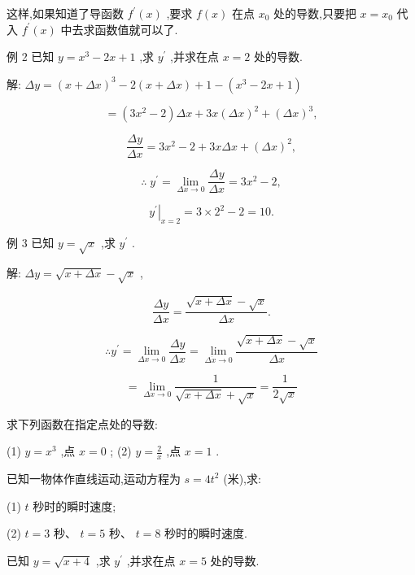 \documentclass[lang=cn,newtx,10pt,scheme=chinese]{elegantbook}
\begin{document}
这样,如果知道了导函数 \({f}^{\prime }\left( x\right)\) ,要求 \(f\left( x\right)\) 在点 \({x}_{0}\) 处的导数,只要把 \(x = {x}_{0}\) 代入 \({f}^{\prime }\left( x\right)\) 中去求函数值就可以了.

例 2 已知 \(y = {x}^{3} - {2x} + 1\) ,求 \({y}^{\prime }\) ,并求在点 \(x = 2\) 处的导数.

解: \({\Delta y} = {\left( x + \Delta x\right) }^{3} - 2\left( {x + {\Delta x}}\right) + 1 - \left( {{x}^{3} - {2x} + 1}\right)\)

\[
= \left( {3{x}^{2} - 2}\right) {\Delta x} + {3x}{\left( \Delta x\right) }^{2} + {\left( \Delta x\right) }^{3},
\]

\[
\frac{\Delta y}{\Delta x} = 3{x}^{2} - 2 + {3x\Delta x} + {\left( \Delta x\right) }^{2},
\]

\[
\therefore \;{y}^{\prime } = \mathop{\lim }\limits_{{{\Delta x} \rightarrow 0}}\frac{\Delta y}{\Delta x} = 3{x}^{2} - 2,
\]

\[
{\left. {y}^{\prime }\right| }_{x = 2} = 3 \times {2}^{2} - 2 = {10}.
\]

例 3 已知 \(y = \sqrt{x}\) ,求 \({y}^{\prime }\) .

解: \({\Delta y} = \sqrt{x + {\Delta x}} - \sqrt{x}\) ,

\[
\frac{\Delta y}{\Delta x} = \frac{\sqrt{x + {\Delta x}} - \sqrt{x}}{\Delta x}.
\]

\[
\therefore {y}^{\prime } = \mathop{\lim }\limits_{{{\Delta x} \rightarrow 0}}\frac{\Delta y}{\Delta x} = \mathop{\lim }\limits_{{\Delta \dot{x} \rightarrow 0}}\frac{\sqrt{x + {\Delta x}} - \sqrt{x}}{\Delta x}
\]

\[
= \mathop{\lim }\limits_{{{\Delta x} \rightarrow 0}}\frac{1}{\sqrt{x + {\Delta x}} + \sqrt{x}} = \frac{1}{2\sqrt{x}}
\]

\begin{problemset}[练习]

\item 求下列函数在指定点处的导数:

(1) \(y = {x}^{3}\) ,点 \(x = 0\) ; (2) \(y = \frac{2}{x}\) ,点 \(x = 1\) .

\item 已知一物体作直线运动,运动方程为 \(s = 4{t}^{2}\) (米),求:

(1) \(t\) 秒时的瞬时速度;

(2) \(t = 3\) 秒、 \(t = 5\) 秒、 \(t = 8\) 秒时的瞬时速度.

\item 已知 \(y = \sqrt{x + 4}\) ,求 \({y}^{\prime }\) ,并求在点 \(x = 5\) 处的导数.

\end{problemset}
\end{document}
